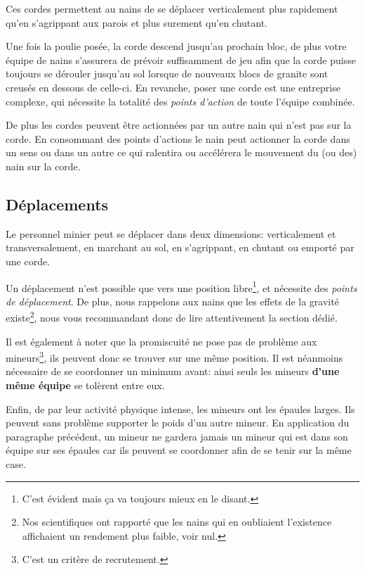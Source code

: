   Ces cordes permettent au nains de se déplacer verticalement plus rapidement
  qu'en s'agrippant aux parois et plus surement qu'en chutant.

  Une fois la poulie posée, la corde descend jusqu'au prochain bloc, de plus
  votre équipe de nains s'assurera de prévoir suffisamment de jeu afin que la
  corde puisse toujours se dérouler jusqu'au sol lorsque de nouveaux blocs de
  granite sont creusés en dessous de celle-ci. En revanche, poser une corde est
  une entreprise complexe, qui nécessite la totalité des \textit{points
  d'action} de toute l'équipe combinée.

  De plus les cordes peuvent être actionnées par un autre nain qui n'est pas
  sur la corde. En consommant des points d'actions le nain peut actionner la
  corde dans un sens ou dans un autre ce qui ralentira ou accélérera le 
  mouvement du (ou des) nain sur la corde.

\subsection{Déplacements}

  Le personnel minier peut se déplacer dans deux dimensions: verticalement et
  transversalement, en marchant au sol, en s'agrippant, en
  chutant ou emporté par une corde.

  Un déplacement n'est possible que vers une position libre\footnote{C'est
  évident mais ça va toujours mieux en le disant.}, et nécessite des
  \textit{points de déplacement}. De plus, nous rappelons aux nains que les
  effets de la gravité existe\footnote{Nos scientifiques ont rapporté que les
  nains qui en oubliaient l'existence affichaient un rendement plus faible,
  voir nul.}, nous vous recommandant donc de lire attentivement la section
  dédié.

  Il est également à noter que la promiscuité ne pose pas de problème aux
  mineurs\footnote{C'est un critère de recrutement.}, ils peuvent donc se
  trouver sur une même position. Il est néanmoins nécessaire de se coordonner
  un minimum avant: ainsi seuls les mineurs \textbf{d'une même équipe} se
  tolèrent entre eux.

  Enfin, de par leur activité physique intense, les mineurs ont les épaules
  larges. Ils peuvent sans problème supporter le poids d'un autre mineur. En
  application du paragraphe précédent, un mineur ne gardera jamais un mineur
  qui est dans son équipe sur ses épaules car ils peuvent se coordonner afin de
  se tenir sur la même case.

